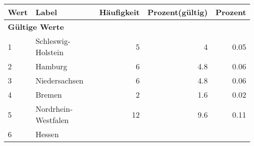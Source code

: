      \begin{longtable}{lXrrr}
     \toprule
     \textbf{Wert} & \textbf{Label} & \textbf{Häufigkeit} & \textbf{Prozent(gültig)} & \textbf{Prozent} \\
     \endhead
     \midrule
     \multicolumn{5}{l}{\textbf{Gültige Werte}}\\

     1 &
     \multicolumn{1}{X}{ Schleswig-Holstein   } &


       \num{5} &
       \num[round-mode=places,round-precision=2]{4} &
         \num[round-mode=places,round-precision=2]{0,05} \\

     2 &
     \multicolumn{1}{X}{ Hamburg   } &


       \num{6} &
       \num[round-mode=places,round-precision=2]{4,8} &
         \num[round-mode=places,round-precision=2]{0,06} \\

     3 &
     \multicolumn{1}{X}{ Niedersachsen   } &


       \num{6} &
       \num[round-mode=places,round-precision=2]{4,8} &
         \num[round-mode=places,round-precision=2]{0,06} \\

     4 &
     \multicolumn{1}{X}{ Bremen   } &


       \num{2} &
       \num[round-mode=places,round-precision=2]{1,6} &
         \num[round-mode=places,round-precision=2]{0,02} \\

     5 &
     \multicolumn{1}{X}{ Nordrhein-Westfalen   } &


       \num{12} &
       \num[round-mode=places,round-precision=2]{9,6} &
         \num[round-mode=places,round-precision=2]{0,11} \\

     6 &
     \multicolumn{1}{X}{ Hessen   } &



\end{longtable}
